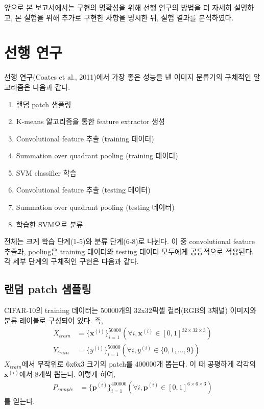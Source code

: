 \documentclass[a4paper,10pt]{article}
\begin{document}
앞으로 본 보고서에서는 구현의 명확성을 위해 선행 연구의 방법을 더 자세히 설명하고, 본 실험을 위해 추가로 구현한 사항을 명시한 뒤, 실험 결과를 분석하였다.

\section{선행 연구}

선행 연구(Coates et al., 2011)에서 가장 좋은 성능을 낸 이미지 분류기의 구체적인 알고리즘은 다음과 같다.
\begin{enumerate}
\item 랜덤 patch 샘플링
\item K-means 알고리즘을 통한 feature extractor 생성
\item Convolutional feature 추출 (training 데이터)
\item Summation over quadrant pooling (training 데이터)
\item SVM classifier 학습
\item Convolutional feature 추출 (testing 데이터)
\item Summation over quadrant pooling (testing 데이터)
\item 학습한 SVM으로 분류
\end{enumerate}
전체는 크게 학습 단계(1-5)와 분류 단계(6-8)로 나뉜다.
이 중 convolutional feature 추출과, pooling은 training 데이터와 testing 데이터 모두에게 공통적으로 적용된다.
각 세부 단계의 구체적인 구현은 다음과 같다.

\subsection{랜덤 patch 샘플링}

CIFAR-10의 training 데이터는 50000개의 32x32픽셀 컬러(RGB의 3채널) 이미지와 분류 레이블로 구성되어 있다.
즉,
\begin{align*}
    X_{train} &= \{ \mathbf{x}^{(i)} \}_{i=1}^{50000} ( \forall i, \mathbf{x}^{(i)} \in [0, 1]^{32 \times 32 \times 3} ) \\
    Y_{train} &= \{ y^{(i)} \}_{i=1}^{50000} ( \forall i, y^{(i)} \in \{0, 1, ..., 9\} )
\end{align*}
$X_{train}$에서 무작위로 6x6x3 크기의 patch를 400000개 뽑는다.
이 때 공평하게 각각의 $\mathbf{x}^{(i)}$에서 8개씩 뽑는다.
이렇게 하여,
\begin{align*}
    P_{sample} &= \{ \mathbf{p}^{(i)} \}_{i=1}^{400000} ( \forall i, \mathbf{p}^{(i)} \in [0, 1]^{6 \times 6 \times 3} )
\end{align*}
를 얻는다.
\end{document}
